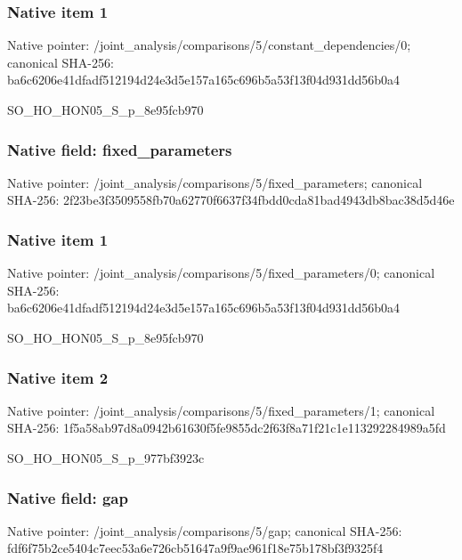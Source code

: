 \documentclass[10pt,a4paper]{article}
\begin{document}
\subsubsection{Native item 1}
Native pointer: /joint\_\allowbreak{}analysis/comparisons/5/constant\_\allowbreak{}dependencies/0; canonical SHA-256: ba6c6206e41dfadf512194d24e3d5e157a165c696b5a53f13f04d931dd56b0a4

\begingroup\raggedright\sloppy SO\_\allowbreak{}HO\_\allowbreak{}HON05\_\allowbreak{}S\_\allowbreak{}p\_\allowbreak{}8e95fcb970\par\endgroup

\subsubsection{Native field: fixed\_\allowbreak{}parameters}
Native pointer: /joint\_\allowbreak{}analysis/comparisons/5/fixed\_\allowbreak{}parameters; canonical SHA-256: 2f23be3f3509558fb70a62770f6637f34fbdd0cda81bad4943db8bac38d5d46e

\subsubsection{Native item 1}
Native pointer: /joint\_\allowbreak{}analysis/comparisons/5/fixed\_\allowbreak{}parameters/0; canonical SHA-256: ba6c6206e41dfadf512194d24e3d5e157a165c696b5a53f13f04d931dd56b0a4

\begingroup\raggedright\sloppy SO\_\allowbreak{}HO\_\allowbreak{}HON05\_\allowbreak{}S\_\allowbreak{}p\_\allowbreak{}8e95fcb970\par\endgroup

\subsubsection{Native item 2}
Native pointer: /joint\_\allowbreak{}analysis/comparisons/5/fixed\_\allowbreak{}parameters/1; canonical SHA-256: 1f5a58ab97d8a0942b61630f5fe9855dc2f63f8a71f21c1e113292284989a5fd

\begingroup\raggedright\sloppy SO\_\allowbreak{}HO\_\allowbreak{}HON05\_\allowbreak{}S\_\allowbreak{}p\_\allowbreak{}977bf3923c\par\endgroup

\subsubsection{Native field: gap}
Native pointer: /joint\_\allowbreak{}analysis/comparisons/5/gap; canonical SHA-256: fdf6f75b2ce5404c7eec53a6e726cb51647a9f9ae961f18e75b178bf3f9325f4
\end{document}
